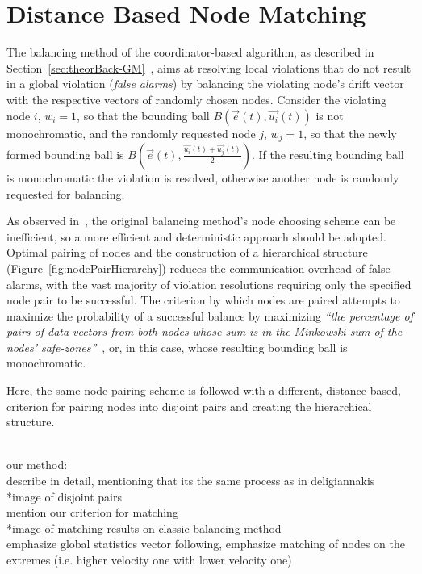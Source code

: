 \section{Distance Based Node Matching} \label{sec:impl-distNodeMatch}

The balancing method of the coordinator-based algorithm, as described in Section~\ref{sec:theorBack-GM}~\cite{Sharfman2006GM, Sharfman2008ShapeSensGM}, aims at resolving local violations that do not result in a global violation (\emph{false alarms}) by balancing the violating node's drift vector with the respective vectors of randomly chosen nodes. Consider the violating node $i$, $w_i=1$, so that the bounding ball $B(\vec{e}(t), \vec{u_i}(t))$ is not monochromatic, and the randomly requested node $j$, $w_j=1$, so that the newly formed bounding ball is $B(\vec{e}(t), \frac{\vec{u_i}(t)+\vec{u_j}(t)}{2})$. If the resulting bounding ball is monochromatic the violation is resolved, otherwise another node is randomly requested for balancing.

As observed in~\cite{Keren2014GMHetStreams}, the original balancing method's node choosing scheme can be inefficient, so a more efficient and deterministic approach should be adopted. Optimal pairing of nodes and the construction of a hierarchical structure (Figure~\ref{fig:nodePairHierarchy}) reduces the communication overhead of false alarms, with the vast majority of violation resolutions requiring only the specified node pair to be successful. The criterion by which nodes are paired attempts to maximize the probability of a successful balance by maximizing \textit{``the percentage of pairs of data vectors from both nodes whose sum is in the Minkowski sum of the nodes' safe-zones''}~\cite{Keren2014GMHetStreams}, or, in this case, whose resulting bounding ball is monochromatic.

Here, the same node pairing scheme is followed with a different, distance based, criterion for pairing nodes into disjoint pairs and creating the hierarchical structure. 

\\
our method:\\
describe in detail, mentioning that its the same process as in deligiannakis\\
*image of disjoint pairs\\
mention our criterion for matching\\
*image of matching results on classic balancing method\\
emphasize global statistics vector following, emphasize matching of nodes on the extremes (i.e. higher velocity one with lower velocity one)

